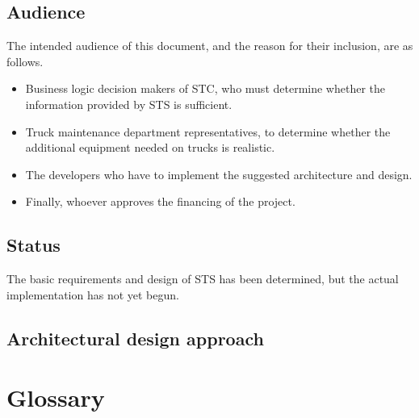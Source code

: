 \documentclass[a4paper,11pt]{report}
\begin{document}
\section{Audience}
\label{sec:audience}

The intended audience of this document, and the reason for their
inclusion, are as follows.

\begin{itemize}
  \item Business logic decision makers of STC, who must determine
    whether the information provided by STS is sufficient.
  \item Truck maintenance department representatives, to determine
    whether the additional equipment needed on trucks is realistic.
  \item The developers who have to implement the suggested architecture and design.
  \item Finally, whoever approves the financing of the project.
\end{itemize}

\section{Status}
\label{sec:status}

The basic requirements and design of STS has been determined, but the
actual implementation has not yet begun.

\section{Architectural design approach}
\label{sec:arch-design-appr}

\chapter{Glossary}
\label{cha:glossary}
\thispagestyle{fancy}
\end{document}
